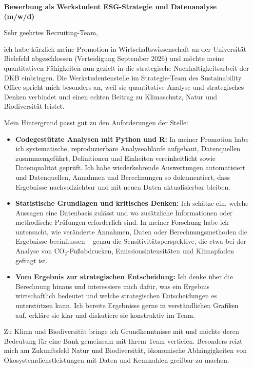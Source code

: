 \documentclass[11pt]{article}
\begin{document}
\vspace{0.05cm}

\noindent
\textbf{Bewerbung als Werkstudent ESG-Strategie und Datenanalyse (m/w/d)}

\noindent Sehr geehrtes Recruiting-Team,

ich habe kürzlich meine Promotion in Wirtschaftswissenschaft an der Universität Bielefeld abgeschlossen (Verteidigung September 2026) und möchte meine quantitativen Fähigkeiten nun gezielt in die strategische Nachhaltigkeitsarbeit der DKB einbringen. Die Werkstudentenstelle im Strategie-Team des Sustainability Office spricht mich besonders an, weil sie quantitative Analyse und strategisches Denken verbindet und einen echten Beitrag zu Klimaschutz, Natur und Biodiversität leistet. 

Mein Hintergrund passt gut zu den Anforderungen der Stelle:

\begin{itemize}
    \item \textbf{Codegestützte Analysen mit Python und R:} In meiner Promotion habe ich systematische, reproduzierbare Analyseabläufe aufgebaut, Datenquellen zusammengeführt, Definitionen und Einheiten vereinheitlicht sowie Datenqualität geprüft. Ich habe wiederkehrende Auswertungen automatisiert und Datenquellen, Annahmen und Berechnungen so dokumentiert, dass Ergebnisse nachvollziehbar und mit neuen Daten aktualisierbar bleiben.
    \item \textbf{Statistische Grundlagen und kritisches Denken:} Ich schätze ein, welche Aussagen eine Datenbasis zulässt und wo zusätzliche Informationen oder methodische Prüfungen erforderlich sind. In meiner Forschung habe ich untersucht, wie veränderte Annahmen, Daten oder Berechnungsmethoden die Ergebnisse beeinflussen -- genau die Sensitivitätsperspektive, die etwa bei der Analyse von CO$_2$-Fußabdrucken, Emissionsintensitäten und Klimapfaden gefragt ist.
    \item \textbf{Vom Ergebnis zur strategischen Entscheidung:} Ich denke über die Berechnung hinaus und interessiere mich dafür, was ein Ergebnis wirtschaftlich bedeutet und welche strategischen Entscheidungen es unterstützen kann. Ich bereite Ergebnisse gerne in verständlichen Grafiken auf, erkläre sie klar und diskutiere sie konstruktiv im Team.
\end{itemize}

Zu Klima und Biodiversität bringe ich Grundkenntnisse mit und möchte deren Bedeutung für eine Bank gemeinsam mit Ihrem Team vertiefen. Besonders reizt mich am Zukunftsfeld Natur und Biodiversität, ökonomische Abhängigkeiten von Ökosystemdienstleistungen mit Daten und Kennzahlen greifbar zu machen.
\end{document}
